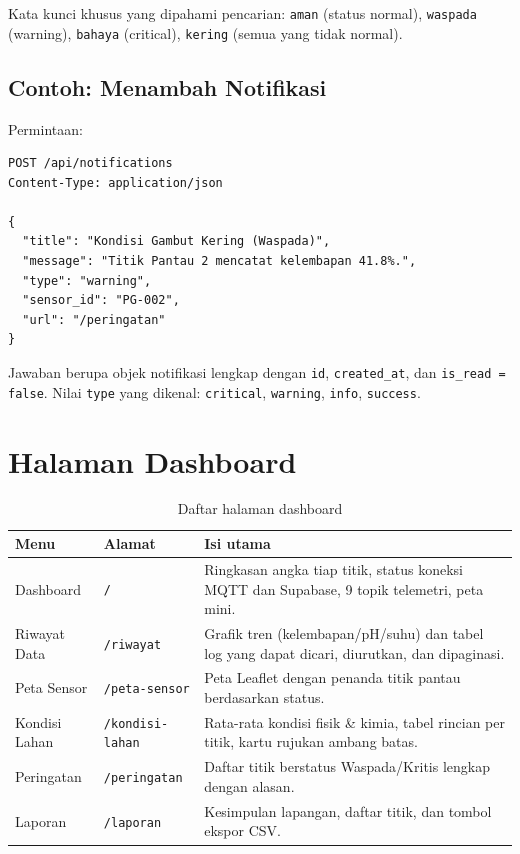 \documentclass[11pt,a4paper]{article}
\newcommand{\kode}[1]{\texttt{#1}}
\begin{document}
Kata kunci khusus yang dipahami pencarian: \kode{aman} (status normal), \kode{waspada} (warning),
\kode{bahaya} (critical), \kode{kering} (semua yang tidak normal).

\subsection{Contoh: Menambah Notifikasi}
Permintaan:
\begin{lstlisting}
POST /api/notifications
Content-Type: application/json

{
  "title": "Kondisi Gambut Kering (Waspada)",
  "message": "Titik Pantau 2 mencatat kelembapan 41.8%.",
  "type": "warning",
  "sensor_id": "PG-002",
  "url": "/peringatan"
}
\end{lstlisting}

Jawaban berupa objek notifikasi lengkap dengan \kode{id}, \kode{created\_at}, dan \kode{is\_read = false}.
Nilai \kode{type} yang dikenal: \kode{critical}, \kode{warning}, \kode{info}, \kode{success}.

\section{Halaman Dashboard}

\begin{table}[H]
\centering
\caption{Daftar halaman dashboard}
\label{tab:halaman}
\begin{tabularx}{\linewidth}{@{}llL@{}}
\toprule
\textbf{Menu} & \textbf{Alamat} & \textbf{Isi utama} \\
\midrule
Dashboard      & \kode{/}               & Ringkasan angka tiap titik, status koneksi MQTT dan Supabase, 9 topik telemetri, peta mini. \\
Riwayat Data   & \kode{/riwayat}        & Grafik tren (kelembapan/pH/suhu) dan tabel log yang dapat dicari, diurutkan, dan dipaginasi. \\
Peta Sensor    & \kode{/peta-sensor}    & Peta Leaflet dengan penanda titik pantau berdasarkan status. \\
Kondisi Lahan  & \kode{/kondisi-lahan}  & Rata-rata kondisi fisik \& kimia, tabel rincian per titik, kartu rujukan ambang batas. \\
Peringatan     & \kode{/peringatan}     & Daftar titik berstatus Waspada/Kritis lengkap dengan alasan. \\
Laporan        & \kode{/laporan}        & Kesimpulan lapangan, daftar titik, dan tombol ekspor CSV. \\
\bottomrule
\end{tabularx}
\end{table}
\end{document}
